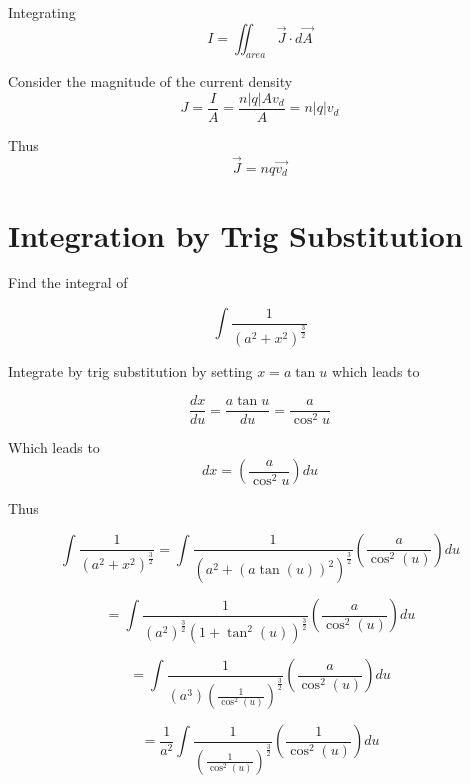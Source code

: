 \documentclass[14pt]{memoir}
\begin{document}
Integrating
\begin{equation}
I = \iint_{area} \vec{J} \cdot d\vec{A}
\end{equation}

Consider the magnitude of the current density
\begin{equation}
J = \frac{I}{A} = \frac{n |q| A v_d}{A} = n |q| v_d
\end{equation}

Thus
\begin{equation}
\vec{J} = nq \vec{v_d}
\end{equation}




\appendix

\chapter{Integration by Trig Substitution}
\label{sec:trigsub}

Find the integral of 

\begin{equation}
\int \frac{1}{(a^2 + x^2)^{\frac{3}{2}}}
\end{equation}

Integrate by trig substitution by setting $x = a\tan{u}$ which leads to 

\begin{equation}
\frac{dx}{du} = \frac{a \tan{u}}{du} = \frac{a}{\cos^2{u}}
\end{equation}

Which leads to 
\begin{equation}
dx = ( \frac{a}{\cos^2{u}}) du 
\end{equation}

Thus

\begin{equation}
\int \frac{1}{(a^2 + x^2)^{\frac{3}{2}}} =  \int \frac{1}{(a^2 + (a\tan{(u)})^2)^{\frac{3}{2}}} ( \frac{a}{\cos^2{(u)}}) du
\end{equation}

\begin{equation}
=  \int \frac{1}{(a^2)^{\frac{3}{2}} (1 + \tan^2{(u)})^{\frac{3}{2}}} ( \frac{a}{\cos^2{(u)}}) du
\end{equation}

\begin{equation}
=  \int \frac{1}{(a^3)(\frac{1}{\cos^2(u)})^{\frac{3}{2}}} ( \frac{a}{\cos^2{(u)}}) du
\end{equation}

\begin{equation}
=  \frac{1}{a^2} \int \frac{1}{(\frac{1}{\cos^2(u)})^{\frac{3}{2}}} ( \frac{1}{\cos^2{(u)}}) du
\end{equation}
\end{document}
